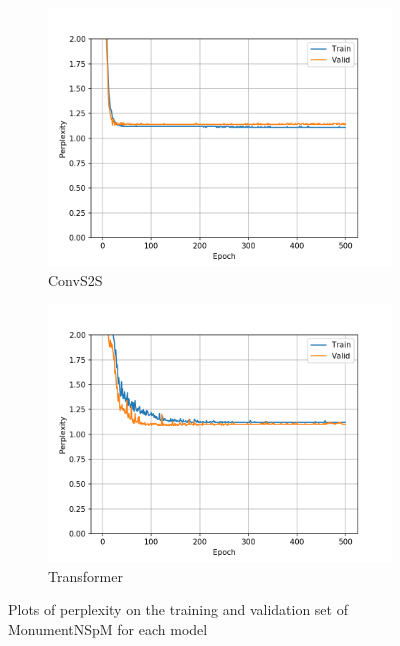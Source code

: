 \begin{figure}[H]
\begin{subfigure}{0.45\textwidth}
\includegraphics[width=\textwidth]{../results/monument_600/run2/fconv_wmt_en_de/ppls.png} 
\caption{ConvS2S}
\label{fig:monu600 convs2s ppl}
\end{subfigure}
\hfill
\begin{subfigure}{0.45\textwidth}
\includegraphics[width=\textwidth]{../results/monument_600/run1/transformer_iwslt_de_en/ppls.png}
\caption{Transformer}
\label{fig:monu600 transformer ppl}
\end{subfigure}
\hfill
\caption{Plots of perplexity on the training and validation set of MonumentNSpM for each model}
\label{fig:monu600 ppls}
\end{figure}

